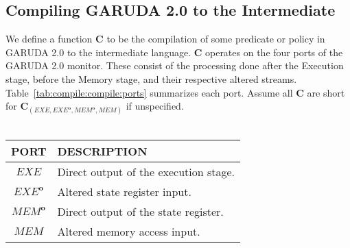 \documentclass[12pt, letterpaper]{article}
\def \sysname {\textsc{GARUDA 2.0}\xspace}
\newcommand\obf[1]{#1^\mathbf{o}}
\begin{document}
    \subsection{Compiling \sysname to the Intermediate}\label{sec:compile:compile}
      We define a function $\mathbf{C}$ to be the compilation of some predicate or policy in \sysname to the intermediate language.
      $\mathbf{C}$ operates on the four ports of the \sysname monitor.
      These consist of the processing done after the Execution stage, before the Memory stage, and their respective altered streams.
      Table~\ref{tab:compile:compile:ports} summarizes each port.
      Assume all $\mathbf{C}$ are short for $\mathbf{C}_{(EXE,\obf{EXE},\obf{MEM},MEM)}$ if unspecified.\\
      \hfill\\
        {\centering
        \begin{tabular}{c | l}
          PORT        & DESCRIPTION \\ \hline
          $EXE$       & Direct output of the execution stage. \\
          $\obf{EXE}$ & Altered state register input. \\
          $\obf{MEM}$ & Direct output of the state register. \\
          $MEM$       & Altered memory access input. 
        \end{tabular}}
\end{document}
